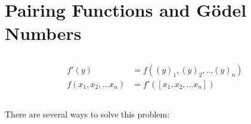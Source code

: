\section{Pairing Functions and G\"odel Numbers}

\subsection{}
\begin{align*}
  f'(y) & = f((y)_{1},(y)_{2},\dots (y)_{n}) \\
  f(x_{1},x_{2},\dots x_{n}) & = f'([x_{1},x_{2},\dots x_{n}])
\end{align*}


\subsection{}
There are several ways to solve this problem:
